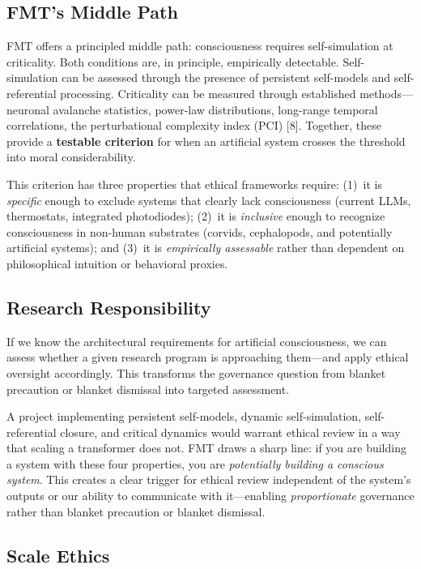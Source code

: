 \documentclass[11pt]{article}
\begin{document}
\subsection{FMT's Middle Path}

FMT offers a principled middle path: consciousness requires self-simulation at criticality. Both conditions are, in principle, empirically detectable. Self-simulation can be assessed through the presence of persistent self-models and self-referential processing. Criticality can be measured through established methods---neuronal avalanche statistics, power-law distributions, long-range temporal correlations, the perturbational complexity index (PCI) [8]. Together, these provide a \textbf{testable criterion} for when an artificial system crosses the threshold into moral considerability.

This criterion has three properties that ethical frameworks require: (1)~it is \emph{specific} enough to exclude systems that clearly lack consciousness (current LLMs, thermostats, integrated photodiodes); (2)~it is \emph{inclusive} enough to recognize consciousness in non-human substrates (corvids, cephalopods, and potentially artificial systems); and (3)~it is \emph{empirically assessable} rather than dependent on philosophical intuition or behavioral proxies.

\subsection{Research Responsibility}

If we know the architectural requirements for artificial consciousness, we can assess whether a given research program is approaching them---and apply ethical oversight accordingly. This transforms the governance question from blanket precaution or blanket dismissal into targeted assessment.

A project implementing persistent self-models, dynamic self-simulation, self-referential closure, and critical dynamics would warrant ethical review in a way that scaling a transformer does not. FMT draws a sharp line: if you are building a system with these four properties, you are \emph{potentially building a conscious system}. This creates a clear trigger for ethical review independent of the system's outputs or our ability to communicate with it---enabling \emph{proportionate} governance rather than blanket precaution or blanket dismissal.

\subsection{Scale Ethics}
\end{document}
